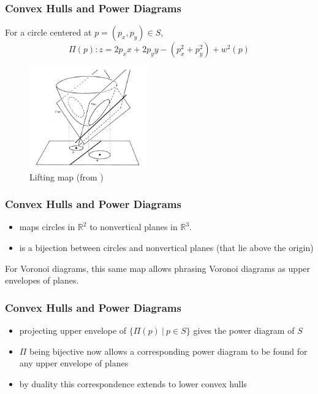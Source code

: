 \documentclass{beamer}
\newcommand{\R}{\mathbb{R}}
\begin{document}
\begin{frame}
  \frametitle{Convex Hulls and Power Diagrams}

  For a circle centered at $p = (p_x, p_y) \in S$,
  \[ \Pi(p): z = 2 p_x x + 2 p_y y - (p_x^2 + p_y^2) + w^2(p) \]

  \begin{figure}
    \includegraphics[width=2in]{lifting(aur_surv).png}
    \caption{Lifting map (from \cite{aurenhammer_survey})}
  \end{figure}

\end{frame}

\begin{frame}
  \frametitle{Convex Hulls and Power Diagrams}

  \begin{itemize}
    \item maps circles in $\R^2$ to nonvertical planes in $\R^3$.
    \item is a bijection between circles and nonvertical planes (that lie above the origin) \cite{aurenhammer_power}
  \end{itemize}

  For Voronoi diagrams, this same map allows phrasing Voronoi diagrams as upper envelopes of planes. \cite{comp_geom}

\end{frame}

\begin{frame}
  \frametitle{Convex Hulls and Power Diagrams}

  \begin{itemize}
    \item projecting upper envelope of $\{ \Pi(p) \ | \ p \in S \}$ gives the power diagram of $S$
    \item $\Pi$ being bijective now allows a corresponding power diagram to be found for any upper envelope of planes
    \item by duality this correspondence extends to lower convex hulls \cite{aurenhammer_power}
  \end{itemize}

\end{frame}
\end{document}

